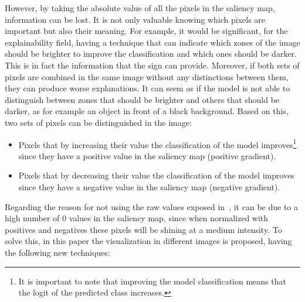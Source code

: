\documentclass[preprint,12pt]{elsarticle}
\begin{document}
However, by taking the absolute value of all the pixels in the saliency map, information can be lost. It is not only valuable knowing which pixels are important but also their meaning. For example, it would be significant, for the explainability field, having a technique that can indicate which zones of the image should be brighter to improve the classification and which ones should be darker. This is in fact the information that the sign can provide. Moreover, if both sets of pixels are combined in the same image without any distinctions between them, they can produce worse explanations. It can seem as if the model is not able to distinguish between zones that should be brighter and others that should be darker, as for example an object in front of a black background. Based on this, two sets of pixels can be distinguished in the image:

\begin{itemize}
    \item Pixels that by increasing their value the classification of the model improves\footnote{It is important to note that improving the model classification means that the logit of the predicted class increases. } since they have a positive value in the saliency map (positive gradient).
    \item Pixels that by decreasing their value the classification of the model improves since they have a negative value in the saliency map (negative gradient).
\end{itemize}

Regarding the reason for not using the raw values exposed in~\cite{Smilkov2017}, it can be due to a high number of 0 values in the saliency map, since when normalized with positives and negatives these pixels will be shining at a medium intensity. To solve this, in this paper the visualization in different images is proposed, having the following new techniques:
\end{document}
